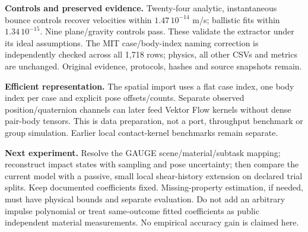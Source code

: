 \documentclass[10pt,a4paper]{article}
\begin{document}
\textbf{Controls and preserved evidence.} Twenty-four analytic, instantaneous
bounce controls recover velocities within $1.47\,10^{-14}$ m/s; ballistic fits
within $1.34\,10^{-15}$. Nine plane/gravity controls pass. These validate the
extractor under its ideal assumptions. The MIT case/body-index naming correction
is independently checked across all 1,718 rows; physics, all other CSVs and metrics
are unchanged. Original evidence, protocols, hashes and source snapshots remain.

\textbf{Efficient representation.} The spatial import uses a flat case index,
one body index per case and explicit pose offsets/counts. Separate observed
position/quaternion channels can later feed Vektor Flow kernels without dense
pair-body tensors. This is data preparation, not a port, throughput benchmark or
group simulation. Earlier local contact-kernel benchmarks remain separate.

\textbf{Next experiment.} Resolve the GAUGE scene/material/subtask mapping;
reconstruct impact states with sampling and pose uncertainty; then compare the
current model with a passive, small local shear-history extension on declared
trial splits. Keep documented coefficients fixed. Missing-property estimation,
if needed, must have physical bounds and separate evaluation. Do not add an
arbitrary impulse polynomial or treat same-outcome fitted coefficients as public
independent material measurements. No empirical accuracy gain is claimed here.
\end{document}
